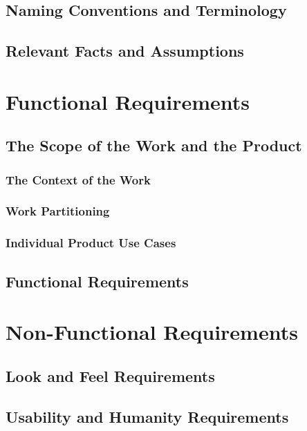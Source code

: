 \documentclass[11pt]{article}
\begin{document}
\subsection{Naming Conventions and Terminology}
\subsection{Relevant Facts and Assumptions}

\section{Functional Requirements}

\subsection{The Scope of the Work and the Product}

\subsubsection{The Context of the Work}
\subsubsection{Work Partitioning}
\subsubsection{Individual Product Use Cases}

\subsection{Functional Requirements}
\section{Non-Functional Requirements}

\subsection{Look and Feel Requirements}

\subsection{Usability and Humanity Requirements}
\end{document}
